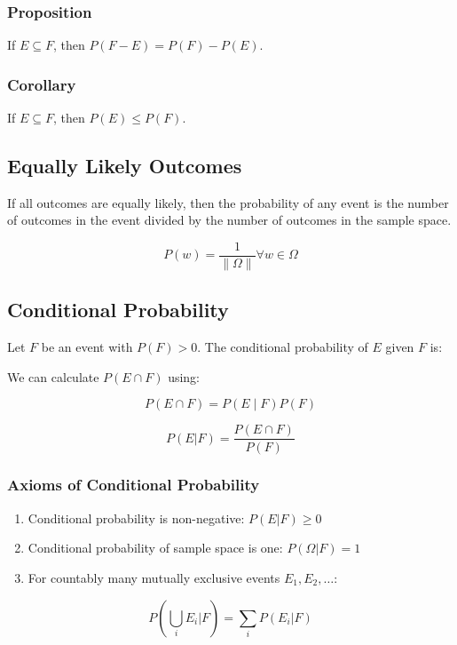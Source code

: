 \subsubsection{Proposition}

If $E \subseteq F$, then $P(F-E) = P(F) - P(E)$.

\subsubsection{Corollary}

If $E \subseteq F$, then $P(E) \leq P(F)$.

\subsection{Equally Likely Outcomes}

If all outcomes are equally likely, then the probability of any event is the number of outcomes in the event divided by the number of outcomes in the sample space.

$$ P(w) = \frac{1}{\|\Omega\|} \forall w \in \Omega $$

\subsection{Conditional Probability}

Let $F$ be an event with $P(F) > 0$. The conditional probability of $E$ given $F$ is:

We can calculate $P(E \cap F)$ using:

$$ P(E \cap F) = P(E \mid F)P(F) $$

$$ P(E|F) = \frac{P(E \cap F)}{P(F)} $$

\subsubsection{Axioms of Conditional Probability}

\begin{enumerate}
    \item Conditional probability is non-negative: $P(E|F) \geq 0$
    \item Conditional probability of sample space is one: $P(\Omega|F) = 1$
    \item For countably many mutually exclusive events $E_1, E_2, \dots$:
\end{enumerate}

$$ P\left(\bigcup_{i} E_i|F\right) = \sum_{i} P(E_i|F) $$

